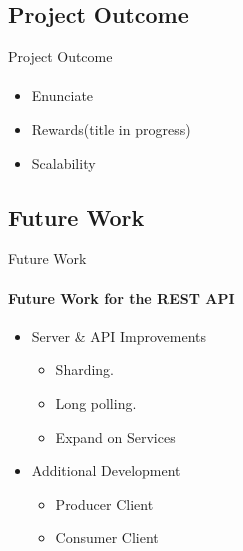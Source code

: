     \subsection{Project Outcome}
    \begin{frame}[t]{Project Outcome}\framesubtitle{}   
        \begin{itemize}
            \item Enunciate
            \item Rewards(title in progress)
            \item Scalability
        \end{itemize}
    \end{frame}

    \subsection{Future Work}
    \begin{frame}[t]{Future Work}\framesubtitle{Future Work for the REST API}
        \begin{itemize}
            \item Server \& API Improvements
            \begin{itemize}
                    \item Sharding. %
                    \item Long polling.
                    \item Expand on Services
            \end{itemize}
            \item Additional Development
            \begin{itemize}
                    \item Producer Client
                    \item Consumer Client
            \end{itemize}
        \end{itemize}
    \end{frame}